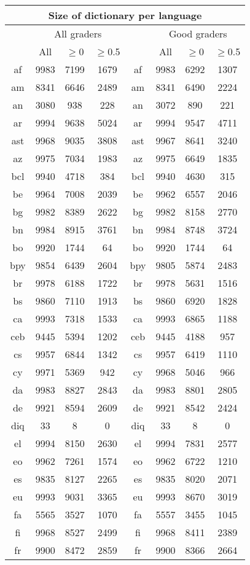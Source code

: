 \begin{figure}[h]
\centering
\begin{tabular}{cccc|cccc}
\multicolumn{8}{c}{Size of dictionary per language}\\
\hline\hline
&\multicolumn{3}{c}{All graders}& &\multicolumn{3}{c}{Good graders}\\
&All&$\geq$0&$\geq$0.5& &All&$\geq$0&$\geq$0.5\\\hline
af&9983&7199&1679&	af&9983&6292&1307\\
am&8341&6646&2489&	am&8341&6490&2224\\
an&3080&938&228&	an&3072&890&221\\
ar&9994&9638&5024&	ar&9994&9547&4711\\
ast&9968&9035&3808&	ast&9967&8641&3240\\
az&9975&7034&1983&	az&9975&6649&1835\\
bcl&9940&4718&384&	bcl&9940&4630&315\\
be&9964&7008&2039&	be&9962&6557&2046\\
bg&9982&8389&2622&	bg&9982&8158&2770\\
bn&9984&8915&3761&	bn&9984&8748&3724\\
bo&9920&1744&64&	bo&9920&1744&64\\
bpy&9854&6439&2604&	bpy&9805&5874&2483\\
br&9978&6188&1722&	br&9978&5631&1516\\
bs&9860&7110&1913&	bs&9860&6920&1828\\
ca&9993&7318&1533&	ca&9993&6865&1188\\
ceb&9445&5394&1202&	ceb&9445&4188&957\\
cs&9957&6844&1342&	cs&9957&6419&1110\\
cy&9971&5369&942&	cy&9968&5046&966\\
da&9983&8827&2843&	da&9983&8801&2805\\
de&9921&8594&2609&	de&9921&8542&2424\\
diq&33&8&0&	diq&33&8&0\\
el&9994&8150&2630&	el&9994&7831&2577\\
eo&9962&7261&1574&	eo&9962&6722&1210\\
es&9835&8127&2265&	es&9835&8020&2071\\
eu&9993&9031&3365&	eu&9993&8670&3019\\
fa&5565&3527&1070&	fa&5557&3455&1045\\
fi&9968&8527&2499&	fi&9968&8411&2389\\
fr&9900&8472&2859&	fr&9900&8366&2664\\

\end{tabular}
\end{figure}
